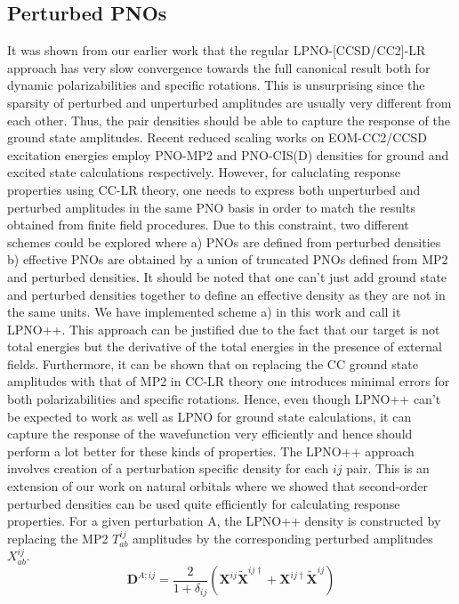 \subsection{Perturbed PNOs}
It was shown from our earlier work that the regular LPNO-[CCSD/CC2]-LR approach has
very slow convergence towards the full canonical result both for dynamic polarizabilities
and specific rotations. This is unsurprising since the sparsity of perturbed 
and unperturbed amplitudes are usually very different from each other. Thus, the 
pair densities should be able to capture the response of the ground state amplitudes. 
Recent reduced scaling works on EOM-CC2/CCSD excitation energies employ 
PNO-MP2 and PNO-CIS(D) densities for ground and excited state calculations respectively.\cite{Hattig13,Hattig18}
However, for caluclating response properties using CC-LR theory, one needs to express both 
unperturbed and perturbed amplitudes in the same PNO basis in order to match the results
obtained from finite field procedures. Due to this constraint, two different 
schemes could be explored where a) PNOs are defined from perturbed densities b) effective PNOs 
are obtained by a union of truncated PNOs defined from MP2 and perturbed densities. It should
be noted that one can't just add ground state and perturbed densities together to define an effective
density as they are not in the same units. We have implemented scheme a) in this work and call it LPNO++.
This approach can be justified due to the fact that our target is not total energies but the 
derivative of the total energies in the presence of external fields. Furthermore, it can
be shown that on replacing the CC ground state amplitudes with that of MP2 in CC-LR theory
one introduces minimal errors for both polarizabilities and specific rotations.\cite{Kumar18:2} 
Hence, even though LPNO++ can't be expected to work as well as LPNO for ground state 
calculations, it can capture the response of the wavefunction very efficiently and 
hence should perform a lot better for these kinds of properties. The LPNO++ approach
involves creation of a perturbation specific density for each $ij$ pair. 
This is an extension of our work on natural orbitals where we showed that second-order
perturbed densities can be used quite efficiently for calculating response properties\cite{Kumar18:1}.
For a given perturbation A, the LPNO++ density is constructed by replacing the MP2 
$T^{ij}_{ab}$ amplitudes by the corresponding perturbed amplitudes $X^{ij}_{ab}$.
\begin{equation}
\bm{D}^{A;ij} = \frac{2}{1+\delta_{ij}} (\bm{X}^{ij}\bm{\tilde{X}}^{ij\dagger} + \bm{X}^{ij\dagger}\bm{\tilde{X}}^{ij})
\end{equation}
